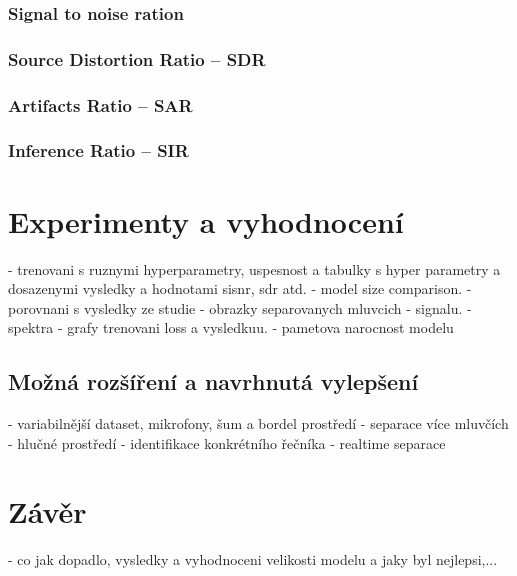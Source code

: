 \subsection{Signal to noise ration}
\subsection*{Source Distortion Ratio -- SDR}
\subsection*{Artifacts Ratio -- SAR}
\subsection*{Inference Ratio -- SIR}





\chapter{Experimenty a vyhodnocení}
\label{experimenty}
- trenovani s ruznymi hyperparametry, uspesnost a tabulky s hyper parametry a dosazenymi vysledky a hodnotami sisnr, sdr atd.
- model size comparison.
- porovnani s vysledky ze studie
- obrazky separovanych mluvcich - signalu.
- spektra
- grafy trenovani loss a vysledkuu.
- pametova narocnost modelu


\section{Možná rozšíření a navrhnutá vylepšení}
- variabilnější dataset, mikrofony, šum a bordel prostředí
- separace více mluvčích
- hlučné prostředí
- identifikace konkrétního řečníka
- realtime separace


\chapter{Závěr}
\label{zaver}
- co jak dopadlo, vysledky a vyhodnoceni velikosti modelu a jaky byl nejlepsi,...
\blindtext[3]

